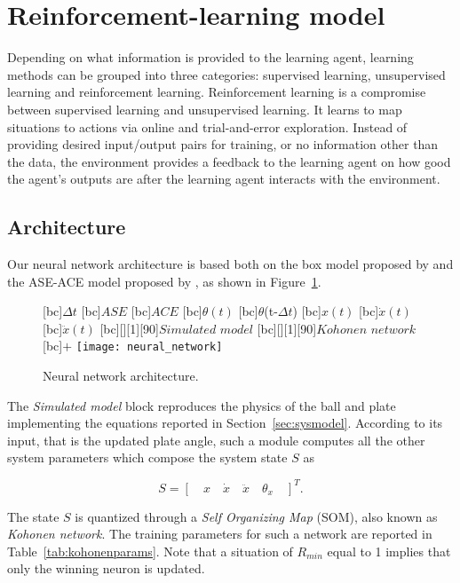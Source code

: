
\section{Reinforcement-learning model}
\label{sec:k-ase}

Depending on what information is provided to the learning agent, learning
methods can be grouped into three categories: supervised learning, unsupervised
learning and reinforcement learning.
Reinforcement learning is a compromise between supervised learning and
unsupervised learning. It learns to map situations to actions via online and
trial-and-error exploration. Instead of providing desired input/output pairs for
training, or no information other than the data, the environment provides a
feedback to the learning agent on how good the agent's outputs are after the
learning agent interacts with the environment.

\subsection{Architecture}

Our neural network architecture is based both on the box model proposed by
\cite{Michie68} and the ASE-ACE model proposed by \cite{Barto90}, as shown in
Figure~\ref{fig:kase}.

\begin{figure}[htb]
  \centering
  [bc]{\small$\Delta t$}
  [bc]{\small$ASE$}
  [bc]{\small$ACE$}
  [bc]{\small$\theta(t)$}
  [bc]{\small$\theta$(t-$\Delta t$)}
  [bc]{\small$x(t)$}
  [bc]{\small$\dot{x}(t)$}
  [bc]{\small$\ddot{x}(t)$}
  [bc][][1][90]{\small$Simulated$ $model$}
  [bc][][1][90]{\small$Kohonen$ $network$}
  \psfrag{+}[bc]{\small$+$}
  \texttt{[image: neural\_network]}
  \caption{Neural network architecture.}
  \label{fig:kase}
\end{figure}

The \emph{Simulated model} block reproduces the physics of the ball and plate
implementing the equations reported in Section~\ref{sec:sysmodel}.
According to its input, that is the updated plate angle, such a module
computes all the other system parameters which compose the system state $S$ as

$$S = [ \quad x \quad \dot{x} \quad \ddot{x} \quad \theta_x \quad ]^T.$$

The state $S$ is quantized through a \emph{Self Organizing Map} (SOM),
also known as \emph{Kohonen network}. 
The training parameters for such a network are reported in
Table~\ref{tab:kohonenparams}.
Note that a situation of $R_{min}$ equal to 1 implies that only the winning
neuron is updated.

